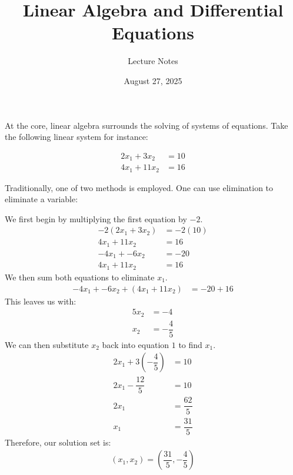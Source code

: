 \documentclass[12pt]{article}
\title{Linear Algebra and Differential Equations}
\author{Lecture Notes}
\date{August 27, 2025}
\begin{document}
\maketitle      %

At the core, linear algebra surrounds the solving of systems of equations. Take the following linear system for instance: \par
\begin{tcolorbox}[problem]
    \vspace{-12pt}
    \begin{align*}
        2x_1 + 3x_2 &= 10 \\
        4x_1 + 11x_2 &= 16
    \end{align*}
\end{tcolorbox}

Traditionally, one of two methods is employed. One can use elimination to eliminate a variable: \par
\begin{tcolorbox}[problem]
    We first begin by multiplying the first equation by $-2$.
    \begin{align*}
        -2(2x_1 + 3x_2) &= -2(10) \\
        4x_1 + 11x_2 &= 16 \\[12pt]
        -4x_1 + -6x_2 &= -20 \\
        4x_1 + 11x_2 &= 16
    \end{align*}
    We then sum both equations to eliminate $x_1$. \begin{align*}
        -4x_1 + -6x_2 + (4x_1 + 11x_2) &= -20 + 16 
    \end{align*}
    This leaves us with: \begin{align*}
        5x_2 &= -4 \\[6pt]
        x_2 &= -\dfrac{4}{5}
    \end{align*}
    We can then substitute $x_2$ back into equation $1$ to find $x_1$. \begin{align*}
        2x_1 + 3\left(-\dfrac{4}{5}\right) &= 10 \\[6pt]
        2x_1 - \dfrac{12}{5} & = 10 \\[6pt]
        2x_1 &= \dfrac{62}{5} \\[6pt]
        x_1 &= \dfrac{31}{5}
    \end{align*}
    Therefore, our solution set is: \begin{align*}
        \boxed{(x_1, x_2) = \left(\dfrac{31}{5}, -\dfrac{4}{5}\right)}
    \end{align*}
\end{tcolorbox}
\end{document}
